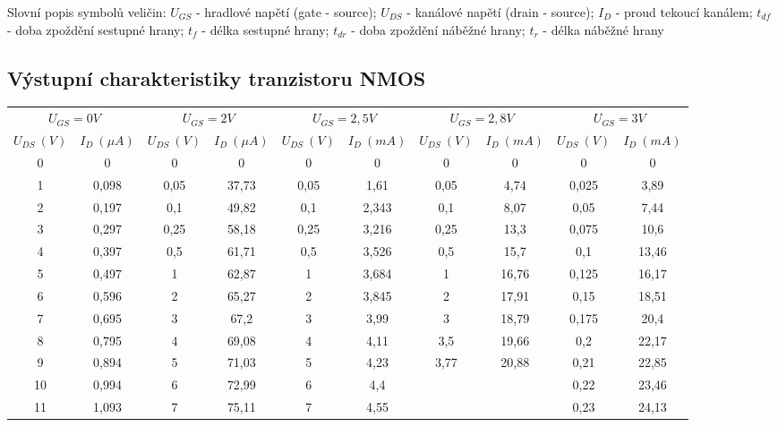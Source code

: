 \documentclass[a4paper, czech]{article}
\begin{document}
Slovní popis symbolů veličin:
$U_{GS}$ - hradlové napětí (gate - source);
$U_{DS}$ - kanálové napětí (drain - source);
$I_D$ - proud tekoucí kanálem;
$t_{df}$ - doba zpoždění sestupné hrany;
$t_{f}$ - délka sestupné hrany;
$t_{dr}$ - doba zpoždění náběžné hrany;
$t_{r}$ - délka náběžné hrany


\subsection{Výstupní charakteristiky tranzistoru NMOS}

\begin{table}[H]
    \centering 
    \begin{tabular}{cccccccccc}
    \toprule
        \multicolumn{2}{c}{$U_{GS} = 0V$} & \multicolumn{2}{c}{$U_{GS} = 2V$} & \multicolumn{2}{c}{$U_{GS} = 2,5V$} & \multicolumn{2}{c}{$U_{GS} = 2,8V$} & \multicolumn{2}{c}{$U_{GS} = 3V$} \\ 
        $U_{DS}\ (V)$ & $I_D\ (\mu A)$ & $U_{DS}\ (V)$ & $I_D\ (\mu A)$ & $U_{DS}\ (V)$ & $I_D\ (mA)$ & $U_{DS}\ (V)$ & $I_D\ (mA)$ & $U_{DS}\ (V)$ & $I_D\ (mA)$ \\
        \midrule
        0  & 0     & 0    & 0      & 0     & 0     & 0    & 0     & 0     & 0     \\
        1  & 0,098 & 0,05 & 37,73  & 0,05  & 1,61  & 0,05 & 4,74  & 0,025 & 3,89  \\
        2  & 0,197 & 0,1  & 49,82  & 0,1   & 2,343 & 0,1  & 8,07  & 0,05  & 7,44  \\
        3  & 0,297 & 0,25 & 58,18  & 0,25  & 3,216 & 0,25 & 13,3  & 0,075 & 10,6  \\
        4  & 0,397 & 0,5  & 61,71  & 0,5   & 3,526 & 0,5  & 15,7  & 0,1   & 13,46 \\
        5  & 0,497 & 1    & 62,87  & 1     & 3,684 & 1    & 16,76 & 0,125 & 16,17 \\
        6  & 0,596 & 2    & 65,27  & 2     & 3,845 & 2    & 17,91 & 0,15  & 18,51 \\
        7  & 0,695 & 3    & 67,2   & 3     & 3,99  & 3    & 18,79 & 0,175 & 20,4  \\
        8  & 0,795 & 4    & 69,08  & 4     & 4,11  & 3,5  & 19,66 & 0,2   & 22,17 \\
        9  & 0,894 & 5    & 71,03  & 5     & 4,23  & 3,77 & 20,88 & 0,21  & 22,85 \\
        10 & 0,994 & 6    & 72,99  & 6     & 4,4   &      &       & 0,22  & 23,46 \\
        11 & 1,093 & 7    & 75,11  & 7     & 4,55  &      &       & 0,23  & 24,13 \\

\end{tabular}
\end{table}
\end{document}
